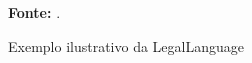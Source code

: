 \begin{figure}[ht!]
\centering

\caption{\textmd{Exemplo ilustrativo da LegalLanguage}}
\label{fig:legallanguageexample}

\par\medskip\textbf{Fonte:} \cite{legallanguage}. \par\medskip

\end{figure}

